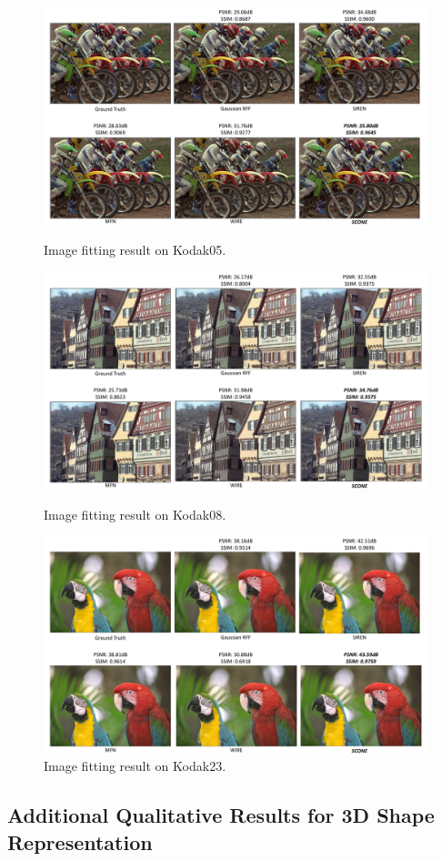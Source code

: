 \documentclass[letterpaper]{article} %
\begin{document}
\begin{figure}[!ht]
    \centering
    \includegraphics[width=.6\columnwidth]{Figures/kodak05_result.pdf}
    \caption{Image fitting result on Kodak05.}
    \label{fig:kodak05_result}

    \centering
    \includegraphics[width=.6\columnwidth]{Figures/kodak08_result.pdf}
    \caption{Image fitting result on Kodak08.}
    \label{fig:kodak08_result}

    \centering
    \includegraphics[width=.6\columnwidth]{Figures/kodak23_result.pdf}
    \caption{Image fitting result on Kodak23.}
    \label{fig:kodak23_result}
\end{figure}



\clearpage

\subsection{Additional Qualitative Results for 3D Shape Representation}
\end{document}
